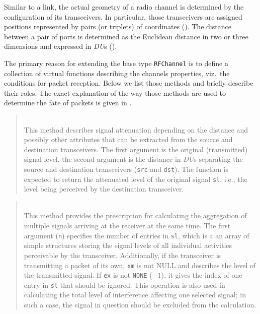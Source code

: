 \medskip

Similar to a link, the actual geometry of a radio channel is determined by
the configuration of its transceivers.
In particular, those transceivers are assigned positions represented by
pairs (or triplets) of coordinates ().
The distance between a pair of ports is determined as the Euclidean distance
in two or three dimensions and expressed in {\em DU\/}s ().

The primary reason for extending the base type {\tt RFChannel} is to define
a collection of virtual functions describing the channels properties, viz.\ the
conditions for packet reception.
Below we list those methods and briefly describe their roles.
The exact explanation of the way those methods are used to determine the
fate of packets is given in .

\medskip

\begin{quote}
\noindent{} \hspace{0in}\vspace{0.05in}\\
\noindent
This method describes signal attenuation depending on the distance and possibly
other attributes that can be extracted from the source and destination
transceivers.
The first argument is the original (transmitted) signal level, the second
argument is the distance in {\em DU\/}s separating the source and destination
transceivers ({\tt src} and {\tt dst}).
The function is expected to return
the attenuated level of the original signal {\tt sl}, i.e., the level being
perceived by the destination transceiver.
\end{quote}

\begin{quote}
\noindent{} \hspace{0in}\vspace{0.05in}\\
\noindent
This method provides the prescription for calculating the aggregation of
multiple signals arriving at the receiver at the same time.
The first argument ({\tt n})
specifies the number of entries in {\tt sl}, which is a
an array of simple structures storing the signal levels of all individual
activities perceivable by the transceiver.
Additionally, if the transceiver is transmitting a packet of its own,
{\tt xm} is not NULL and describes the level of
the transmitted signal.
If {\tt ex} is not {\tt NONE} ($-1$), it gives the index of one entry
in {\tt sl} that should be ignored.
This operation is also used in calculating the total level of interference
affecting one selected signal; in such a case, the signal in question should be
excluded from the calculation.
\end{quote}

